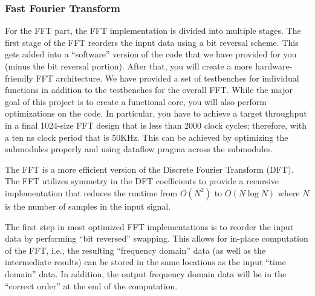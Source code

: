 \documentclass[a4paper,12pt,twoside]{article}
\begin{document}
\subsubsection{Fast Fourier Transform}
For the FFT part, the FFT implementation is divided into multiple stages. The first stage of the FFT reorders the input data using a bit reversal scheme. This gets added into a “software” version of the code that we have provided for you (minus the bit reversal portion). After that, you will create a more hardware-friendly FFT architecture. We have provided a set of testbenches for individual functions in addition to the testbenches for the overall FFT. While the major goal of this project is to create a functional core, you will also perform optimizations on the code. In particular, you have to achieve a target throughput in a final 1024-size FFT design that is less than 2000 clock cycles; therefore, with a ten ns clock period that is 50KHz. This can be achieved by optimizing the submodules properly and using dataflow pragma across the submodules.

The FFT is a more efficient version of the Discrete Fourier Transform (DFT). The FFT utilizes symmetry in the DFT coefficients to provide a recursive implementation that reduces the runtime from $O(N^2)$ to $O(N\log{N})$ where $N$ is the number of samples in the input signal.

The first step in most optimized FFT implementations is to reorder the input data by performing “bit reversed” swapping. This allows for in-place computation of the FFT, i.e., the resulting “frequency domain” data (as well as the intermediate results) can be stored in the same locations as the input “time domain” data. In addition, the output frequency domain data will be in the “correct order” at the end of the computation.
\end{document}
